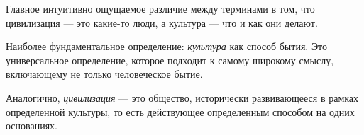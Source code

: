 Главное интуитивно ощущаемое различие между терминами в том, что цивилизация --- это
какие-то люди, а культура --- что и как они делают.

Наиболее фундаментальное определение: \textit{культура} как способ бытия. 
Это универсальное определение, которое подходит к самому широкому смыслу,
включающему не только человеческое бытие. 


Аналогично, \textit{цивилизация} --- это общество, исторически развивающееся в рамках определенной культуры, то есть действующее определенным способом на одних основаниях. 



